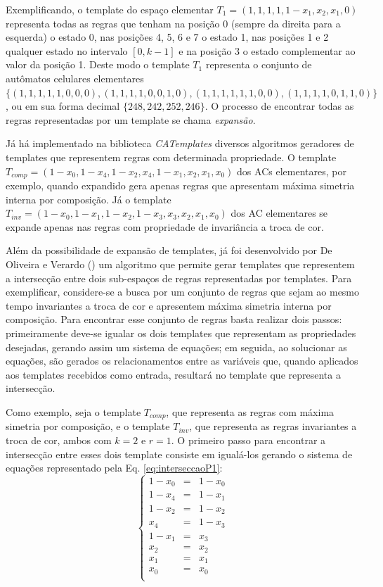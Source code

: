 \documentclass[12pt, a4paper]{article}
\begin{document}
Exemplificando, o template do espaço elementar $T_1 = (1,1,1,1,1-x_1,x_2,x_1,0)$ representa todas as regras que tenham na posição 0 (sempre da direita para a esquerda) o estado 0, nas posições 4, 5, 6 e 7 o estado 1, nas posições 1 e 2 qualquer estado no intervalo $[0,k-1]$ e na posição 3 o estado complementar ao valor da posição 1. Deste modo o template $T_1$ representa o conjunto de autômatos celulares elementares $\{(1,1,1,1,1,0,0,0),(1,1,1,1,0,0,1,0),(1,1,1,1,1,1,0,0),(1,1,1,1,0,1,1,0)\}$, ou em sua forma decimal $\{248,242,252,246\}$. O processo de encontrar todas as regras representadas por um template se chama \textit{expansão}.

Já há implementado na biblioteca \textit{CATemplates} \cite{CATemplates} diversos algoritmos geradores de templates que representem regras com determinada propriedade. O template $T_{comp} = (1 - x_0, 1 - x_4, 1 - x_2, x_4, 1 - x_1, x_2, x_1, x_0)$ dos ACs elementares, por exemplo, quando expandido gera apenas regras que apresentam máxima simetria interna por composição. Já o template $T_{inv} = (1 - x_0, 1 - x_1, 1 - x_2, 1 - x_3, x_3, x_2, x_1, x_0)$ dos AC elementares se expande apenas nas regras com propriedade de invariância a troca de cor.

Além da possibilidade de expansão de templates, já foi desenvolvido por De Oliveira e Verardo (\citeyear{deOliveira2014b}) um algoritmo que permite gerar templates que representem a intersecção entre dois sub-espaços de regras representadas por templates. Para exemplificar, considere-se a busca por um conjunto de regras que sejam ao mesmo tempo invariantes a troca de cor e apresentem máxima simetria interna por composição. Para encontrar esse conjunto de regras basta realizar dois passos: primeiramente deve-se igualar os dois templates que representam as propriedades desejadas, gerando assim um sistema de equações; em seguida, ao solucionar as equações, são gerados os relacionamentos entre as variáveis que, quando aplicados aos templates recebidos como entrada, resultará no template que representa a intersecção.

Como exemplo, seja o template $T_{comp}$, que representa as regras com máxima simetria por composição, e o template $T_{inv}$, que representa as regras invariantes a troca de cor, ambos com $k=2$ e $r=1$. O primeiro passo para encontrar a intersecção entre esses dois template consiste em igualá-los gerando o sistema de equações representado pela Eq. \ref{eq:interseccaoP1}:
\begin{equation}
\left\{\begin{matrix}
1 - x_0	& = & 1 - x_0	\\
1 - x_4	& = & 1 - x_1	\\
1 - x_2	& = & 1 - x_2	\\
x_4		& = & 1 - x_3	\\
1 - x_1	& = & x_3		\\
x_2		& = & x_2		\\
x_1		& = & x_1		\\
x_0		& = & x_0		\\
\end{matrix}\right.
\label{eq:interseccaoP1}
\end{equation}
\end{document}
